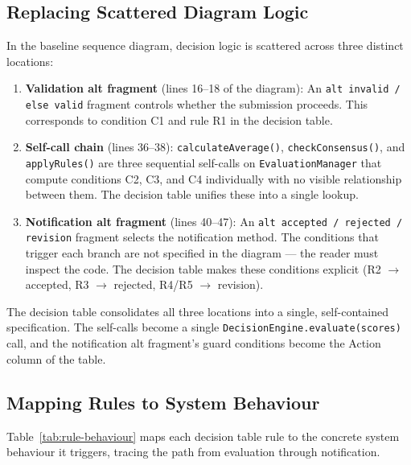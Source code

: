 \documentclass[12pt, a4paper]{article}
\begin{document}
\subsection{Replacing Scattered Diagram Logic}

In the baseline sequence diagram, decision logic is scattered across three distinct locations:

\begin{enumerate}[nosep]
    \item \textbf{Validation alt fragment} (lines 16--18 of the diagram): An \texttt{alt invalid / else valid} fragment controls whether the submission proceeds. This corresponds to condition C1 and rule R1 in the decision table.
    \item \textbf{Self-call chain} (lines 36--38): \texttt{calculateAverage()}, \texttt{checkConsensus()}, and \texttt{applyRules()} are three sequential self-calls on \texttt{EvaluationManager} that compute conditions C2, C3, and C4 individually with no visible relationship between them. The decision table unifies these into a single lookup.
    \item \textbf{Notification alt fragment} (lines 40--47): An \texttt{alt accepted / rejected / revision} fragment selects the notification method. The conditions that trigger each branch are not specified in the diagram --- the reader must inspect the code. The decision table makes these conditions explicit (R2 $\rightarrow$ accepted, R3 $\rightarrow$ rejected, R4/R5 $\rightarrow$ revision).
\end{enumerate}

The decision table consolidates all three locations into a single, self-contained specification. The self-calls become a single \texttt{DecisionEngine.evaluate(scores)} call, and the notification alt fragment's guard conditions become the Action column of the table.

\subsection{Mapping Rules to System Behaviour}

Table~\ref{tab:rule-behaviour} maps each decision table rule to the concrete system behaviour it triggers, tracing the path from evaluation through notification.
\end{document}
